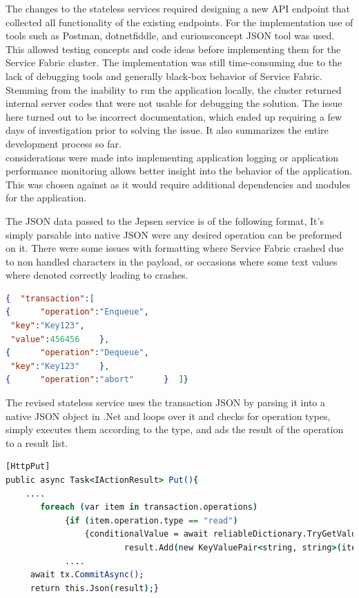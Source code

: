 \documentclass[a4paper,10pt,titlepage]{report}
\begin{document}
The changes to the stateless services required designing a new API endpoint that collected all functionality of the existing endpoints. For the implementation use of tools such as Postman, dotnetfiddle, and curiousconcept JSON tool was used. This allowed testing concepts and code ideas before implementing them for the Service Fabric cluster. The implementation was still time-consuming due to the lack of debugging tools and generally black-box behavior of Service Fabric. Stemming from the inability to run the application locally, the cluster returned internal server codes that were not usable for debugging the solution. The issue here turned out to be incorrect documentation, which ended up requiring a few days of investigation prior to solving the issue. It also summarizes the entire development process so far.\\ 

considerations were made into implementing application logging or application performance monitoring allows better insight into the  behavior of the application. This was chosen against as it would require additional dependencies and modules for the application.

\vspace{5mm}

The JSON data passed to the Jepsen service is of the following format, It's simply parsable into native JSON were any desired operation can be preformed on it. There were some issues with formatting where Service Fabric crashed due to non handled characters in the payload, or occasions where some text values where denoted correctly leading to crashes. \\
\begin{lstlisting}[language=json]
{  "transaction":[
{      "operation":"Enqueue",
 "key":"Key123",
 "value":456456    },
{      "operation":"Dequeue",
 "key":"Key123"    },
{      "operation":"abort"      }  ]}
\end{lstlisting}  

The revised stateless service uses the transaction JSON by parsing it into a native JSON object in .Net and loops over it and checks for operation types, simply executes them according to the type, and ads the result of the operation to a result list.
\begin{lstlisting}[language=csh]
[HttpPut]
public async Task<IActionResult> Put(){
    ....
       foreach (var item in transaction.operations)
            {if (item.operation.type == "read")
                {conditionalValue = await reliableDictionary.TryGetValueAsync(tx, item.key.Value);
                        result.Add(new KeyValuePair<string, string>(item.key.Value, value.ToString()));}
            ....
     await tx.CommitAsync();
     return this.Json(result);}
\end{lstlisting}  
\end{document}
